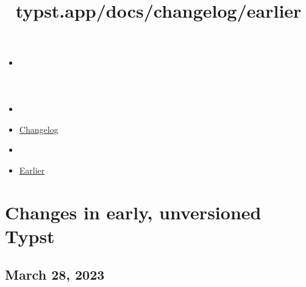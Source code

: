 \title{typst.app/docs/changelog/earlier}

\begin{itemize}
\tightlist
\item
  \href{/docs}{}
\item
  
\item
  \href{/docs/changelog/}{Changelog}
\item
  
\item
  \href{/docs/changelog/earlier/}{Earlier}
\end{itemize}

\section{Changes in early, unversioned
Typst}\label{changes-in-early-unversioned-typst}

\subsection{March 28, 2023}\label{march-28-2023}

